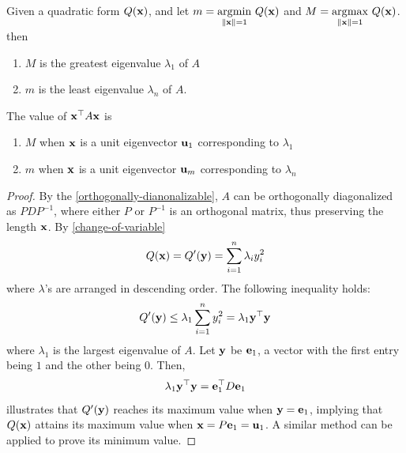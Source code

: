     \begin{Thm}\label{unit-opt}
        Given a quadratic form $Q(\mathbf{x})$, and let $m = \underset{\lVert \B{x} \rVert = 1}{\argmin}\ Q({\B{x}})$ and $M = \underset{\lVert \mathbf{x} \rVert = 1}{\operatorname*{arg\!\max}}\ Q({\mathbf{x}})$. then 
        \begin{enumerate}
            \item $M$ is the greatest eigenvalue $\lambda_1$ of $A$
            \item $m$ is the least eigenvalue $\lambda_n$ of $A$.
        \end{enumerate}
        The value of $\mathbf{x}^{\top}A\mathbf{x}$ is
        \begin{enumerate}
            \item $M$ when $\mathbf{x}$ is a unit eigenvector $\mathbf{u}_1$ corresponding to $\lambda_1$
            \item $m$ when $\mathbf{x}$ is a unit eigenvector $\mathbf{u}_m$ corresponding to $\lambda_n$
        \end{enumerate}
        \begin{proof}
            By the \cref{orthogonally-dianonalizable}, $A$ can be orthogonally diagonalized as $PDP^{-1}$, where either $P$ or $P^{-1}$ is an orthogonal matrix, thus preserving the length $\mathbf{x}$. By \cref{change-of-variable}
            \begin{equation*}
                Q(\mathbf{x}) = Q'(\mathbf{y}) = \sum_{i = 1}^n \lambda_i y_i^2
            \end{equation*}
            where $\lambda$'s are arranged in descending order. The following inequality holds:
            \begin{align*}
                Q'(\mathbf{y})\leq \lambda_1 \sum_{i = 1}^n y_i^2 = \lambda_1 \mathbf{y}^{\top}\mathbf{y}
            \end{align*}
            where $\lambda_1$ is the largest eigenvalue of $A$. Let $\mathbf{y}$ be $\mathbf{e}_1$, a vector with the first entry being $1$ and the other being $0$. Then,
            \begin{equation*}
                \lambda_1 \mathbf{y}^{\top}\mathbf{y} = \mathbf{e}_1^{\top} D\mathbf{e}_1 
            \end{equation*}
            illustrates that $Q'(\mathbf{y})$ reaches its maximum value when $\mathbf{y} = \mathbf{e}_1$, implying that $Q(\mathbf{x})$ attains its maximum value when $\mathbf{x} = P\mathbf{e}_1 = \mathbf{u}_1$. A similar method can be applied to prove its minimum value.
        \end{proof}
    \end{Thm}
